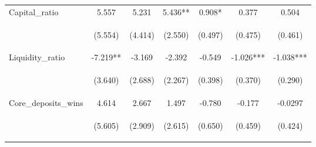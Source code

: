 \begin{tabular}{lcccccc}
Capital\_ratio & 5.557 & 5.231 & 5.436** & 0.908* & 0.377 & 0.504 \\
\vspace{4pt} & \begin{footnotesize}(5.554)\end{footnotesize} & \begin{footnotesize}(4.414)\end{footnotesize} & \begin{footnotesize}(2.550)\end{footnotesize} & \begin{footnotesize}(0.497)\end{footnotesize} & \begin{footnotesize}(0.475)\end{footnotesize} & \begin{footnotesize}(0.461)\end{footnotesize} \\
Liquidity\_ratio & -7.219** & -3.169 & -2.392 & -0.549 & -1.026*** & -1.038*** \\
\vspace{4pt} & \begin{footnotesize}(3.640)\end{footnotesize} & \begin{footnotesize}(2.688)\end{footnotesize} & \begin{footnotesize}(2.267)\end{footnotesize} & \begin{footnotesize}(0.398)\end{footnotesize} & \begin{footnotesize}(0.370)\end{footnotesize} & \begin{footnotesize}(0.290)\end{footnotesize} \\
Core\_deposits\_wins & 4.614 & 2.667 & 1.497 & -0.780 & -0.177 & -0.0297 \\
\vspace{4pt} & \begin{footnotesize}(5.605)\end{footnotesize} & \begin{footnotesize}(2.909)\end{footnotesize} & \begin{footnotesize}(2.615)\end{footnotesize} & \begin{footnotesize}(0.650)\end{footnotesize} & \begin{footnotesize}(0.459)\end{footnotesize} & \begin{footnotesize}(0.424)\end{footnotesize} \\

\end{tabular}
